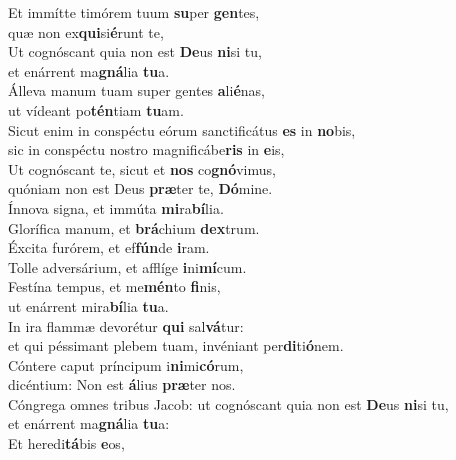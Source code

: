 \evenverse Et immítte timórem tuum \textbf{su}per \textbf{gen}tes,~\*\\
\evenverse quæ non ex\textbf{qui}si\textbf{é}runt te,\\
\oddverse Ut cognóscant quia non est \textbf{De}us \textbf{ni}si tu,~\*\\
\oddverse et enárrent ma\textbf{gná}lia \textbf{tu}a.\\
\evenverse Álleva manum tuam super gentes \textbf{a}li\textbf{é}nas,~\*\\
\evenverse ut vídeant po\textbf{tén}tiam \textbf{tu}am.\\
\oddverse Sicut enim in conspéctu eórum sanctificátus \textbf{es} in \textbf{no}bis,~\*\\
\oddverse sic in conspéctu nostro magnificábe\textbf{ris} in \textbf{e}is,\\
\evenverse Ut cognóscant te, sicut et \textbf{nos} co\textbf{gnó}vimus,~\*\\
\evenverse quóniam non est Deus \textbf{præ}ter te, \textbf{Dó}mine.\\
\oddverse Ínnova signa, et immúta \textbf{mi}ra\textbf{bí}lia.~\*\\
\oddverse Glorífica manum, et \textbf{brá}chium \textbf{dex}trum.\\
\evenverse Éxcita furórem, et ef\textbf{fún}de \textbf{i}ram.~\*\\
\evenverse Tolle adversárium, et afflíge \textbf{i}ni\textbf{mí}cum.\\
\oddverse Festína tempus, et me\textbf{mén}to \textbf{fi}nis,~\*\\
\oddverse ut enárrent mira\textbf{bí}lia \textbf{tu}a.\\
\evenverse In ira flammæ devorétur \textbf{qui} sal\textbf{vá}tur:~\*\\
\evenverse et qui péssimant plebem tuam, invéniant per\textbf{di}ti\textbf{ó}nem.\\
\oddverse Cóntere caput príncipum i\textbf{ni}mi\textbf{có}rum,~\*\\
\oddverse dicéntium: Non est \textbf{á}lius \textbf{præ}ter nos.\\
\evenverse Cóngrega omnes tribus Jacob: ut cognóscant quia non est \textbf{De}us \textbf{ni}si tu,~\*\\
\evenverse et enárrent ma\textbf{gná}lia \textbf{tu}a:\\
\oddverse Et heredi\textbf{tá}bis \textbf{e}os,~\*\\
